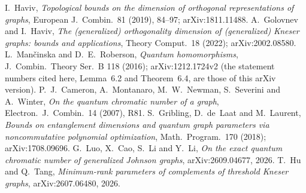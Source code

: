  I.~Haviv, \emph{Topological bounds on the dimension of orthogonal representations of graphs},
European J.\ Combin.\ 81 (2019), 84--97; arXiv:1811.11488.
 A.~Golovnev and I.~Haviv, \emph{The (generalized) orthogonality dimension of (generalized) Kneser
graphs: bounds and applications}, Theory Comput.\ 18 (2022); arXiv:2002.08580.
 L.~Man\v{c}inska and D.~E.~Roberson, \emph{Quantum homomorphisms}, J.\ Combin.\ Theory Ser.~B
118 (2016); arXiv:1212.1724v2 (the statement numbers cited here, Lemma~6.2 and Theorem~6.4, are those of
this arXiv version).
 P.~J.~Cameron, A.~Montanaro, M.~W.~Newman, S.~Severini and A.~Winter, \emph{On the quantum
chromatic number of a graph}, Electron.\ J.\ Combin.\ 14 (2007), R81.
 S.~Gribling, D.~de~Laat and M.~Laurent, \emph{Bounds on entanglement dimensions and quantum
graph parameters via noncommutative polynomial optimization}, Math.\ Program.\ 170 (2018); arXiv:1708.09696.
 G.~Luo, X.~Cao, S.~Li and Y.~Li, \emph{On the exact quantum chromatic number of generalized
Johnson graphs}, arXiv:2609.04677, 2026.
 T.~Hu and Q.~Tang, \emph{Minimum-rank parameters of complements of threshold Kneser graphs},
arXiv:2607.06480, 2026.
